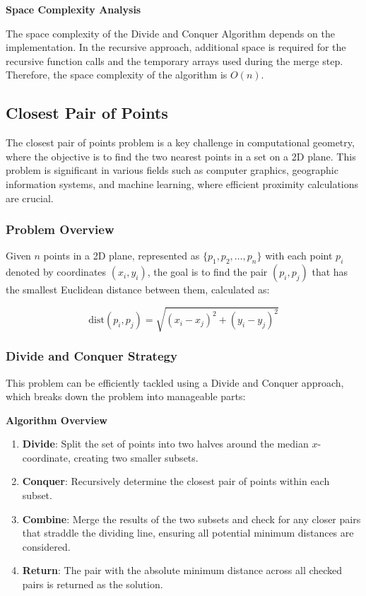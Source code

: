 \documentclass[12pt]{book} %
\begin{document}
\textbf{Space Complexity Analysis}

The space complexity of the Divide and Conquer Algorithm depends on the implementation. In the recursive approach, additional space is required for the recursive function calls and the temporary arrays used during the merge step. Therefore, the space complexity of the algorithm is $O(n)$.

\subsection{Closest Pair of Points}

The closest pair of points problem is a key challenge in computational geometry, where the objective is to find the two nearest points in a set on a 2D plane. This problem is significant in various fields such as computer graphics, geographic information systems, and machine learning, where efficient proximity calculations are crucial.

\subsubsection{Problem Overview}

Given \( n \) points in a 2D plane, represented as \( \{ p_1, p_2, \ldots, p_n \} \) with each point \( p_i \) denoted by coordinates \( (x_i, y_i) \), the goal is to find the pair \( (p_i, p_j) \) that has the smallest Euclidean distance between them, calculated as:

\[
\text{dist}(p_i, p_j) = \sqrt{(x_i - x_j)^2 + (y_i - y_j)^2}
\]

\subsubsection{Divide and Conquer Strategy}

This problem can be efficiently tackled using a Divide and Conquer approach, which breaks down the problem into manageable parts:

\textbf{Algorithm Overview}

\begin{enumerate}
    \item \textbf{Divide}: Split the set of points into two halves around the median \( x \)-coordinate, creating two smaller subsets.
    \item \textbf{Conquer}: Recursively determine the closest pair of points within each subset.
    \item \textbf{Combine}: Merge the results of the two subsets and check for any closer pairs that straddle the dividing line, ensuring all potential minimum distances are considered.
    \item \textbf{Return}: The pair with the absolute minimum distance across all checked pairs is returned as the solution.
\end{enumerate}
\end{document}
